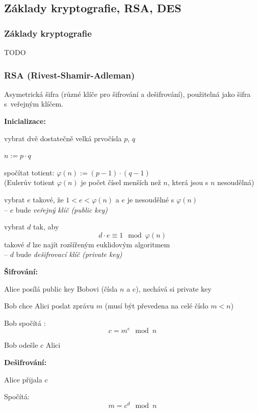 \subsection{Základy kryptografie, RSA, DES}

\subsubsection*{Základy kryptografie}
TODO

\subsubsection*{RSA (Rivest-Shamir-Adleman)}
Asymetrická šifra (různé klíče pro šifrování a dešifrování), použitelná jako šifra s veřejným klíčem.

\textbf{Inicializace:}
\begin{penumerate}
	\item vybrat dvě dostatečně velká prvočísla $p$, $q$
	\item $n:= p\cdot q$
	\item spočítat totient: $\varphi(n) := (p-1)\cdot (q-1)$\\ 
	(Eulerův totient $\varphi(n)$ je počet čísel menších než $n$, která jsou s $n$ nesoudělná)
	\item vybrat $e$ takové, že $1 < e < \varphi(n)$ a $e$ je nesoudělné s $\varphi(n)$\\ -- $e$ bude \emph{veřejný klíč (public key)}
	\item vybrat $d$ tak, aby 
		$$d\cdot e \equiv 1 \mod \varphi(n)$$ 
		takové $d$ lze najít rozšířeným euklidovým algoritmem\\
		-- $d$ bude \emph{dešifrovací klíč (private key)}
\end{penumerate}

\textbf{Šifrování:}
\begin{penumerate}
	\item Alice posílá public key Bobovi (čísla $n$ a $e$), nechává si private key
	\item Bob chce Alici poslat zprávu $m$ (musí být převedena na celé číslo $m < n$)
	\item Bob spočítá :
		$$c = m^e \mod n$$
	\item Bob odešle $c$ Alici
\end{penumerate}

\textbf{Dešifrování:}
\begin{penumerate}
\item Alice přijala $c$
\item Spočítá:
	$$m = c^d \mod n$$
\end{penumerate}

